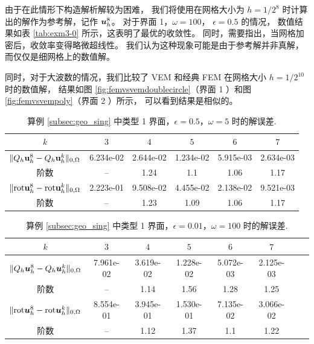 由于在此情形下构造解析解较为困难，
我们将使用在网格大小为 $h = 1/2^8$ 时计算出的解作为参考解，记作 $\boldsymbol{u}^8_h$。
对于界面 1，$\omega = 100$， $\epsilon = 0.5$ 的情况，
数值结果如表 \ref{tab:exm3-0} 所示，这表明了最优的收敛性。
同时，需要指出，当网格加密后，收敛率变得略微超线性。
我们认为这种现象可能是由于参考解并非真解，而仅仅是细网格上的数值解。

同时，对于大波数的情况，我们比较了 VEM 和经典 FEM 在网格大小 $h = 1/2^{10}$ 时的数值解，
结果如图 \ref{fig:femvsvemdoublecircle}（界面 1 ）和图
\ref{fig:femvsvempoly}（界面 2 ）所示，
可以看到结果是相似的。

\begin{table}[!h]
\centering
\caption{算例 \ref{subsec:geo_sing} 中类型 1 界面，$\epsilon = 0.5$，$\omega =
5$ 时的解误差.}
\label{tab:exm3-0}
\begin{tabular}[c]{|c|c|c|c|c|c|}\hline
$k$ & $3$ & $4$ & $5$ & $6$ & $7$
\\\hline
$\|Q_h{\bf u}_h^8 - Q_h{\bf u}_h^k\|_{0,\Omega}$ & 6.234e-02 & 2.644e-02 & 1.234e-02 & 5.915e-03 & 2.634e-03
\\\hline
阶数 & -- & 1.24 & 1.1  & 1.06 & 1.17
\\\hline
$\|{\rm rot} {\bf u}_h^8 - {\rm rot} {\bf u}_h^k\|_{0,\Omega}$  & 2.223e-01 & 9.508e-02 & 4.455e-02 & 2.138e-02 & 9.521e-03
\\\hline
阶数 & -- & 1.23 & 1.09 & 1.06 & 1.17
\\\hline
\end{tabular}
\label{tab:eps05}
\end{table}

\begin{table}[!htp]
\centering
\caption{算例 \ref{subsec:geo_sing} 中类型 1 界面，$\epsilon = 0.01$，$\omega =
100$ 时的解误差.}
\label{tab:exm3-2}
\begin{tabular}[c]{|c|c|c|c|c|c|c|c|}\hline
$k$ & $3$ & $4$ & $5$ & $6$ & $7$
\\\hline
$\| Q_h\boldsymbol{u}_h^8 - Q_h\boldsymbol{u}_h^k\|_{0,\Omega}$ & 7.961e-02 & 3.619e-02 & 1.228e-02 & 5.072e-03 & 2.125e-03
\\\hline
阶数 & -- & 1.14 & 1.56 & 1.28 & 1.25
\\\hline
$\|\mathrm{rot} \boldsymbol{u}_h^8 - \mathrm{rot} \boldsymbol{u}_h^k\|_{0,\Omega}$ & 8.554e-01 & 3.945e-01 & 1.530e-01 & 7.135e-02 & 3.066e-02
\\\hline
阶数 & -- &  1.12 &  1.37 &  1.1  &  1.22
\\\hline
\end{tabular}
\end{table}

